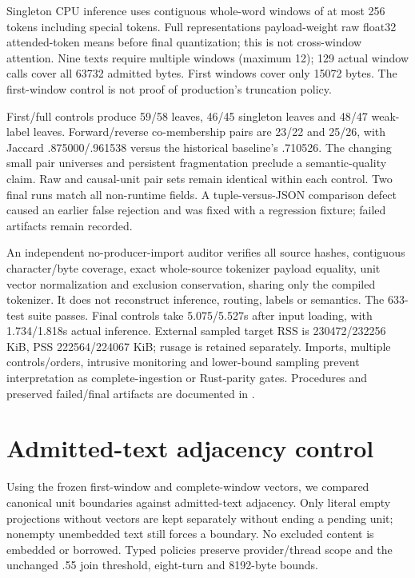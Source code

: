 \documentclass[11pt]{article}
\begin{document}
Singleton CPU inference uses contiguous whole-word windows of at most 256
tokens including special tokens. Full representations payload-weight raw
float32 attended-token means before final quantization; this is not cross-window
attention. Nine texts require multiple windows (maximum 12); 129 actual window
calls cover all 63732 admitted bytes. First windows cover only 15072 bytes.
The first-window control is not proof of production's truncation policy.

First/full controls produce 59/58 leaves, 46/45 singleton leaves and 48/47
weak-label leaves. Forward/reverse co-membership pairs are 23/22 and 25/26,
with Jaccard .875000/.961538 versus the historical baseline's .710526.
The changing small pair universes and persistent fragmentation preclude a
semantic-quality claim. Raw and causal-unit pair sets remain identical within
each control. Two final runs match all non-runtime fields. A tuple-versus-JSON
comparison defect caused an earlier false rejection and was fixed with a
regression fixture; failed artifacts remain recorded.

An independent no-producer-import auditor verifies all source hashes, contiguous
character/byte coverage, exact whole-source tokenizer payload equality, unit
vector normalization and exclusion conservation, sharing only the compiled
tokenizer. It does not reconstruct inference, routing, labels or semantics.
The 633-test suite passes. Final controls take 5.075/5.527s after input loading,
with 1.734/1.818s actual inference. External sampled target RSS is
230472/232256 KiB, PSS 222564/224067 KiB; rusage is retained separately.
Imports, multiple controls/orders, intrusive monitoring and lower-bound sampling
prevent interpretation as complete-ingestion or Rust-parity gates.
Procedures and preserved failed/final artifacts are documented in
.

\section{Admitted-text adjacency control}
Using the frozen first-window and complete-window vectors, we compared
canonical unit boundaries against admitted-text adjacency. Only literal empty
projections without vectors are kept separately without ending a pending unit;
nonempty unembedded text still forces a boundary. No excluded content is
embedded or borrowed. Typed policies preserve provider/thread scope and the
unchanged .55 join threshold, eight-turn and 8192-byte bounds.
\end{document}
